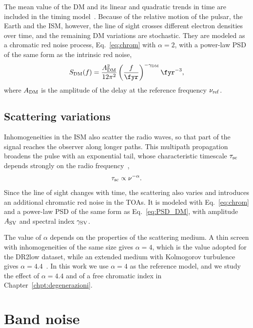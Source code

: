 The mean value of the DM and its linear and quadratic trends in time are
included in the timing model~\cite{Taylor2021}. Because of the relative motion of the pulsar,
the Earth and the ISM, however, the line of sight crosses different electron
densities over time, and the remaining DM variations are stochastic. They are
modeled as a chromatic red noise process, Eq.~\eqref{eq:chrom} with
$\alpha = 2$, with a power-law PSD of the same form as the intrinsic red noise,
\begin{equation}
    S_{\rm DM}(f) = \frac{A_{\rm DM}^2}{12\pi^2}
    \left(\frac{f}{\fyr}\right)^{-\gamma_{\rm DM}}\fyr^{-3},
    \label{eq:PSD_DM}
\end{equation}
where $A_{\rm DM}$ is the amplitude of the delay at the reference frequency
$\nu_{\rm ref}$.

\subsection{Scattering variations} \label{sec:sv}

Inhomogeneities in the ISM also scatter the radio waves, so that part of the
signal reaches the observer along longer paths. This multipath propagation
broadens the pulse with an exponential tail, whose characteristic timescale
$\tau_{\rm sc}$ depends strongly on the radio
frequency~\cite{Shaifullah2025},
\begin{equation}
    \tau_{\rm sc} \propto \nu^{-\alpha}.
    \label{eq:scattering}
\end{equation}
Since the line of sight changes with time, the scattering also varies and
introduces an additional chromatic red noise in the TOAs. It is modeled with
Eq.~\eqref{eq:chrom} and a power-law PSD of the same form as
Eq.~\eqref{eq:PSD_DM}, with amplitude $A_{\rm SV}$ and spectral index
$\gamma_{\rm SV}$.

The value of $\alpha$ depends on the properties of the scattering medium. A
thin screen with inhomogeneities of the same size gives $\alpha = 4$, which is
the value adopted for the DR2low dataset, while an extended medium with
Kolmogorov turbulence gives $\alpha = 4.4$~\cite{Iraci2025}. In this work we use $\alpha = 4$ as
the reference model, and we study the effect of $\alpha = 4.4$ and of a free
chromatic index in Chapter~\ref{chpt:degenerazioni}.

\section{Band noise} \label{sec:bn}


